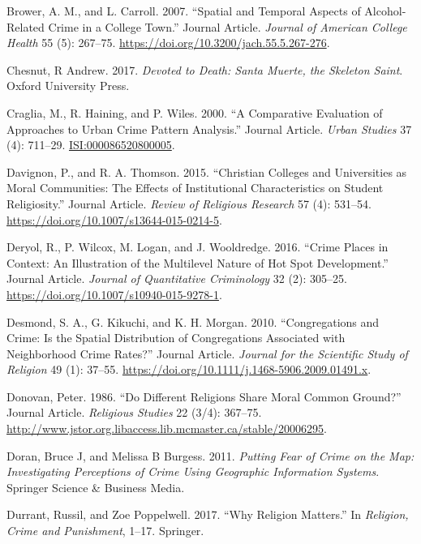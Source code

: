 \documentclass[smallextended]{svjour3}       %
\begin{document}
\leavevmode\hypertarget{ref-Brower2007spatial}{}%
Brower, A. M., and L. Carroll. 2007. ``Spatial and Temporal Aspects of
Alcohol-Related Crime in a College Town.'' Journal Article.
\emph{Journal of American College Health} 55 (5): 267--75.
\url{https://doi.org/10.3200/jach.55.5.267-276}.

\leavevmode\hypertarget{ref-Chesnut2017devoted}{}%
Chesnut, R Andrew. 2017. \emph{Devoted to Death: Santa Muerte, the
Skeleton Saint}. Oxford University Press.

\leavevmode\hypertarget{ref-Craglia2000comparative}{}%
Craglia, M., R. Haining, and P. Wiles. 2000. ``A Comparative Evaluation
of Approaches to Urban Crime Pattern Analysis.'' Journal Article.
\emph{Urban Studies} 37 (4): 711--29. \url{ISI:000086520800005}.

\leavevmode\hypertarget{ref-Davignon2015christian}{}%
Davignon, P., and R. A. Thomson. 2015. ``Christian Colleges and
Universities as Moral Communities: The Effects of Institutional
Characteristics on Student Religiosity.'' Journal Article. \emph{Review
of Religious Research} 57 (4): 531--54.
\url{https://doi.org/10.1007/s13644-015-0214-5}.

\leavevmode\hypertarget{ref-Deryol2016crime}{}%
Deryol, R., P. Wilcox, M. Logan, and J. Wooldredge. 2016. ``Crime Places
in Context: An Illustration of the Multilevel Nature of Hot Spot
Development.'' Journal Article. \emph{Journal of Quantitative
Criminology} 32 (2): 305--25.
\url{https://doi.org/10.1007/s10940-015-9278-1}.

\leavevmode\hypertarget{ref-Desmond2010congregations}{}%
Desmond, S. A., G. Kikuchi, and K. H. Morgan. 2010. ``Congregations and
Crime: Is the Spatial Distribution of Congregations Associated with
Neighborhood Crime Rates?'' Journal Article. \emph{Journal for the
Scientific Study of Religion} 49 (1): 37--55.
\url{https://doi.org/10.1111/j.1468-5906.2009.01491.x}.

\leavevmode\hypertarget{ref-Donovan1986different}{}%
Donovan, Peter. 1986. ``Do Different Religions Share Moral Common
Ground?'' Journal Article. \emph{Religious Studies} 22 (3/4): 367--75.
\url{http://www.jstor.org.libaccess.lib.mcmaster.ca/stable/20006295}.

\leavevmode\hypertarget{ref-Doran2011putting}{}%
Doran, Bruce J, and Melissa B Burgess. 2011. \emph{Putting Fear of Crime
on the Map: Investigating Perceptions of Crime Using Geographic
Information Systems}. Springer Science \& Business Media.

\leavevmode\hypertarget{ref-Durrant2017religion}{}%
Durrant, Russil, and Zoe Poppelwell. 2017. ``Why Religion Matters.'' In
\emph{Religion, Crime and Punishment}, 1--17. Springer.
\end{document}

